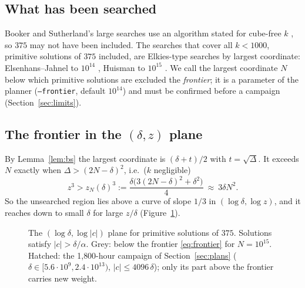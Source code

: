 \documentclass[11pt,a4paper]{article}
\theoremstyle{remark}
\begin{document}
\subsection{What has been searched}
Booker and Sutherland's large searches \cite{BS,Booker} use an algorithm stated for cube-free
$k$ \cite{Suth22}, so $375$ may not have been included. The searches that cover all $k<1000$,
primitive solutions of $375$ included, are Elkies-type searches by largest coordinate:
Elsenhans--Jahnel to $10^{14}$ \cite{EJ}, Huisman to $10^{15}$ \cite{Huisman}. We call the
largest coordinate $N$ below which primitive solutions are excluded the \emph{frontier}; it is a
parameter of the planner (\texttt{--frontier}, default $10^{14}$) and must be confirmed before a
campaign (Section~\ref{sec:limits}).

\subsection{The frontier in the $(\delta,z)$ plane}
By Lemma~\ref{lem:bs} the largest coordinate is $(\delta+t)/2$ with $t=\sqrt\Delta$. It exceeds
$N$ exactly when $\Delta>(2N-\delta)^2$, i.e.\ ($k$ negligible)
\begin{equation}\label{eq:frontier}
  z^3>z_N(\delta)^3:=\frac{\delta\bigl(3(2N-\delta)^2+\delta^2\bigr)}{4}\ \approx\ 3\delta N^2 .
\end{equation}
So the unsearched region lies above a curve of slope $1/3$ in $(\log\delta,\log z)$, and it
reaches down to small $\delta$ for large $z/\delta$ (Figure~\ref{fig:plane}).

\begin{figure}[ht]
\centering

\caption{The $(\log\delta,\log|c|)$ plane for primitive solutions of $375$. Solutions satisfy
$|c|>\delta/\alpha$. Grey: below the frontier \eqref{eq:frontier} for $N=10^{15}$. Hatched: the
1{,}800-hour campaign of Section~\ref{sec:plans} ($\delta\in[5.6\cdot10^9,2.4\cdot10^{13})$,
$|c|\le4096\,\delta$); only its part above the frontier carries new weight.}
\label{fig:plane}
\end{figure}
\end{document}
